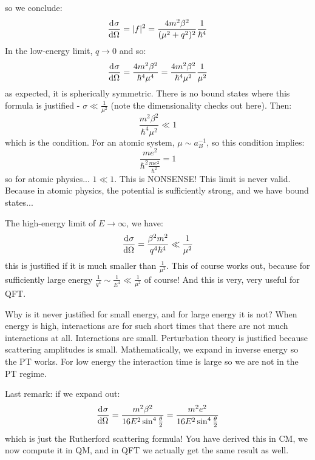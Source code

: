 so we conclude:
\begin{equation}
    \dod{\sigma}{\Omega} = \abs{f}^2 = \frac{4m^2\beta^2}{(\mu^2 + q^2)^2}\frac{1}{\hbar^4}
\end{equation}
In the low-energy limit, $q \to 0$ and so:
\begin{equation}
    \dod{\sigma}{\Omega} = \frac{4m^2\beta^2}{\hbar^4\mu^4} = \frac{4m^2\beta^2}{\hbar^4\mu^2}\frac{1}{\mu^2}
\end{equation}
as expected, it is spherically symmetric. There is no bound states where this formula is justified - $\sigma \ll \frac{1}{\mu^2}$ (note the dimensionality checks out here). Then:
\begin{equation}
    \frac{m^2\beta^2}{\hbar^4\mu^2} \ll 1
\end{equation}
which is the condition. For an atomic system, $\mu \sim a_B^{-1}$, so this condition implies:
\begin{equation}
    \frac{me^2}{\hbar^2 \frac{me^2}{\hbar^2}} = 1 
\end{equation}
so for atomic physics... $1 \ll 1$. This is NONSENSE! This limit is never valid. Because in atomic physics, the potential is sufficiently strong, and we have bound states... 

The high-energy limit of $E \to \infty$, we have:
\begin{equation}
    \dod{\sigma}{\Omega} = \frac{\beta^2m^2}{q^4\hbar^4} \ll \frac{1}{\mu^2}
\end{equation}
this is justified if it is much smaller than $\frac{1}{\mu^2}$. This of course works out, because for sufficiently large energy $\frac{1}{q^4} \sim \frac{1}{E^4} \ll \frac{1}{\mu^2}$ of course! And this is very, very useful for QFT. 

Why is it never justified for small energy, and for large energy it is not? When energy is high, interactions are for such short times that there are not much interactions at all. Interactions are small. Perturbation theory is justified because scattering amplitudes is small. Mathematically, we expand in inverse energy so the PT works. For low energy the interaction time is large so we are not in the PT regime.

Last remark: if we expand out:
\begin{equation}
    \dod{\sigma}{\Omega} = \frac{m^2\beta^2}{16E^2 \sin^4\frac{\theta}{2}} = \frac{m^2 e^2}{16E^2 \sin^4\frac{\theta}{2}}
\end{equation}
which is just the Rutherford scattering formula! You have derived this in CM, we now compute it in QM, and in QFT we actually get the same result as well.